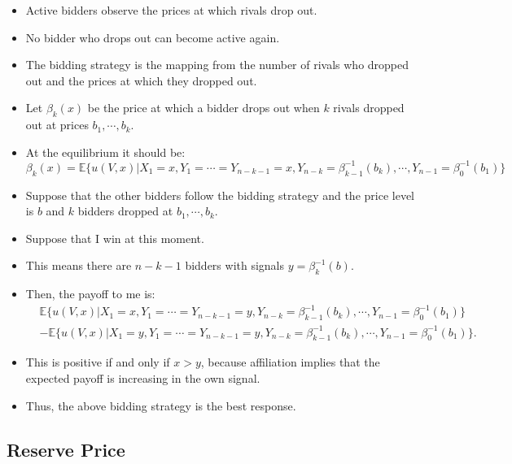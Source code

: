 \documentclass[
]{book}
\providecommand{\tightlist}{%
  \setlength{\itemsep}{0pt}\setlength{\parskip}{0pt}}
\begin{document}
\begin{itemize}
  \begin{itemize}
  \tightlist
  \item
    Active bidders observe the prices at which rivals drop out.
  \item
    No bidder who drops out can become active again.
  \item
    The bidding strategy is the mapping from the number of rivals who dropped out and the prices at which they dropped out.
  \item
    Let \(\beta_k(x)\) be the price at which a bidder drops out when \(k\) rivals dropped out at prices \(b_1, \cdots, b_k\).
  \item
    At the equilibrium it should be:
    \[
      \beta_k(x) = \mathbb{E}\{u(V, x)| X_1 = x, Y_1 = \cdots = Y_{n - k - 1} = x, Y_{n - k} = \beta_{k - 1}^{-1}(b_k), \cdots, Y_{n - 1} = \beta_0^{-1}(b_1)\}
      \]
  \item
    Suppose that the other bidders follow the bidding strategy and the price level is \(b\) and \(k\) bidders dropped at \(b_1, \cdots, b_k\).
  \item
    Suppose that I win at this moment.
  \item
    This means there are \(n - k - 1\) bidders with signals \(y = \beta_k^{-1}(b)\).
  \item
    Then, the payoff to me is:
    \begin{equation}
      \begin{split}
      &\mathbb{E}\{u(V, x)| X_1 = x, Y_1 = \cdots = Y_{n - k - 1} = y, Y_{n - k} = \beta_{k - 1}^{-1}(b_k), \cdots, Y_{n - 1} = \beta_0^{-1}(b_1)\}\\
      &- \mathbb{E}\{u(V, x)| X_1 = y, Y_1 = \cdots = Y_{n - k - 1} = y, Y_{n - k} = \beta_{k - 1}^{-1}(b_k), \cdots, Y_{n - 1} = \beta_0^{-1}(b_1)\}.
      \end{split}
      \end{equation}
  \item
    This is positive if and only if \(x > y\), because affiliation implies that the expected payoff is increasing in the own signal.
  \item
    Thus, the above bidding strategy is the best response.
  \end{itemize}
\end{itemize}

\hypertarget{reserve-price}{%
\subsection{Reserve Price}\label{reserve-price}}
\end{document}
